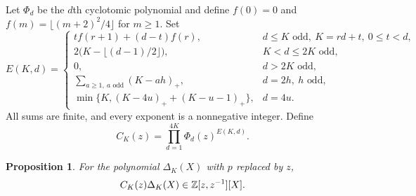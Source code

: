 \documentclass[11pt,letterpaper]{article}
\numberwithin{equation}{section}
\newtheorem{proposition}[theorem]{Proposition}
\theoremstyle{remark}\newtheorem{remark}[theorem]{Remark}
\begin{document}
Let $\Phi_d$ be the $d$th cyclotomic polynomial and define $f(0)=0$ and $f(m)=\lfloor(m+2)^2/4\rfloor$ for $m\ge1$. Set
\begin{equation}\label{eq:E}
 E(K,d)=
 \begin{cases}
 t f(r+1)+(d-t)f(r),&d\le K\text{ odd},\ K=rd+t,\ 0\le t<d,\\
 2\bigl(K-\lfloor(d-1)/2\rfloor\bigr),&K<d\le2K\text{ odd},\\
 0,&d>2K\text{ odd},\\
 \displaystyle\sum_{a\ge1,\ a\text{ odd}}(K-ah)_+,&d=2h,\ h\text{ odd},\\
 \min\{K,(K-4u)_++(K-u-1)_+\},&d=4u.
 \end{cases}
\end{equation}
All sums are finite, and every exponent is a nonnegative integer. Define
\begin{equation}\label{eq:C}
 C_K(z)=\prod_{d=1}^{4K}\Phi_d(z)^{E(K,d)}.
\end{equation}
\begin{proposition}\label{prop:clearer}
For the polynomial $\Delta_K(X)$ with $p$ replaced by $z$,
\begin{equation}\label{eq:Laurent}
 C_K(z)\Delta_K(X)\in\mathbb Z[z,z^{-1}][X].
\end{equation}
\end{proposition}
\end{document}
